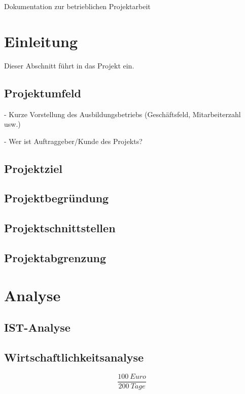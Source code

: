 \documentclass{article}
\begin{document}
\newpage
\begin{titlepage}
	\centering
	Dokumentation zur betrieblichen Projektarbeit
\end{titlepage}
\newpage


\newpage
\tableofcontents
\newpage

\newpage
\listoffigures
\newpage


\section{Einleitung}
Dieser Abschnitt führt in das Projekt ein.

\subsection{Projektumfeld}
- Kurze Vorstellung des Ausbildungsbetriebs (Geschäftsfeld, Mitarbeiterzahl usw.)

- Wer ist Auftraggeber/Kunde des Projekts?

\subsection{Projektziel}

\subsection{Projektbegründung}

\subsection{Projektschnittstellen}

\subsection{Projektabgrenzung}

\section{Analyse}

\subsection{IST-Analyse}

\subsection{Wirtschaftlichkeitsanalyse}
\[ \frac{100~Euro}{200~Tage} \]
\end{document}
